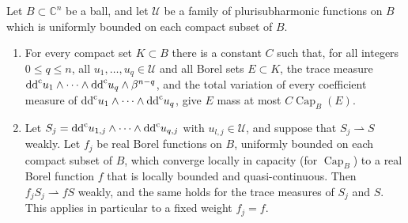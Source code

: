 \begin{lemma}\label{lem:bounded-product-capacity-domination}
Let $B\subset\mathbb C^n$ be a ball, and let $\mathcal U$ be a family of plurisubharmonic functions on $B$ which is uniformly bounded on each compact subset of $B$.
\begin{enumerate}
\item For every compact set $K\subset B$ there is a constant $C$ such that, for all integers $0\le q\le n$, all $u_1,\ldots,u_q\in\mathcal U$ and all Borel sets $E\subset K$, the trace measure $\mathrm{dd}^{\mathrm{c}} u_1\wedge\cdots\wedge\mathrm{dd}^{\mathrm{c}} u_q\wedge\beta^{n-q}$, and the total variation of every coefficient measure of $\mathrm{dd}^{\mathrm{c}} u_1\wedge\cdots\wedge\mathrm{dd}^{\mathrm{c}} u_q$, give $E$ mass at most $C\operatorname{Cap}_B(E)$.
\item Let $S_j=\mathrm{dd}^{\mathrm{c}} u_{1,j}\wedge\cdots\wedge\mathrm{dd}^{\mathrm{c}} u_{q,j}$ with $u_{l,j}\in\mathcal U$, and suppose that $S_j\rightharpoonup S$ weakly. Let $f_j$ be real Borel functions on $B$, uniformly bounded on each compact subset of $B$, which converge locally in capacity (for $\operatorname{Cap}_B$) to a real Borel function $f$ that is locally bounded and quasi-continuous. Then $f_jS_j\rightharpoonup fS$ weakly, and the same holds for the trace measures of $S_j$ and $S$. This applies in particular to a fixed weight $f_j=f$.
\end{enumerate}
\end{lemma}
